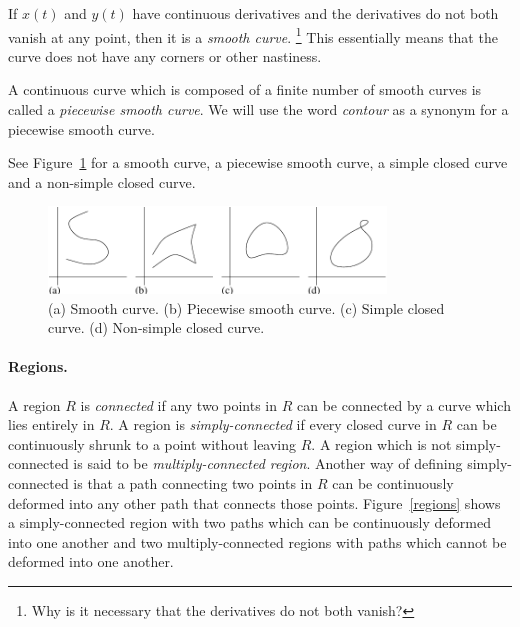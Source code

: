 If $x(t)$ and $y(t)$ have continuous derivatives and the derivatives
do not both vanish at any point, then it is a \textit{smooth curve}.%
\footnote{Why is it necessary that the derivatives do not both vanish?}
This essentially means that the curve does not have any corners or other
nastiness.

A continuous curve which is composed of a finite number of smooth curves
is called a \textit{piecewise smooth curve}.
We will use the word \textit{contour}
as a synonym for a piecewise smooth curve.


See Figure~\ref{curves} for a smooth curve, a piecewise smooth curve,
a simple closed curve and a non-simple closed curve.
\begin{figure}[htbp!]
  \begin{center}
      \includegraphics[width=0.8\textwidth]{fcv/function/curves}
  \end{center}
  \caption{(a) Smooth curve. (b) Piecewise smooth curve.
    (c) Simple closed curve. (d) Non-simple closed curve.}
  \label{curves}
\end{figure}






\paragraph{Regions.}
A region $R$ is \textit{connected} if any two points in $R$ can be connected
by a curve which lies entirely in $R$.
A region is \textit{simply-connected} if every closed curve
in $R$ can be continuously shrunk to a point without leaving $R$.
A region which is not simply-connected is said to be
\textit{multiply-connected region}.
Another way of defining simply-connected is that a path connecting two
points in $R$ can be continuously deformed into any other path that connects
those points.  Figure~\ref{regions} shows a simply-connected region with
two paths which can be continuously deformed into one another and two
multiply-connected regions with paths which cannot be deformed into one
another.

